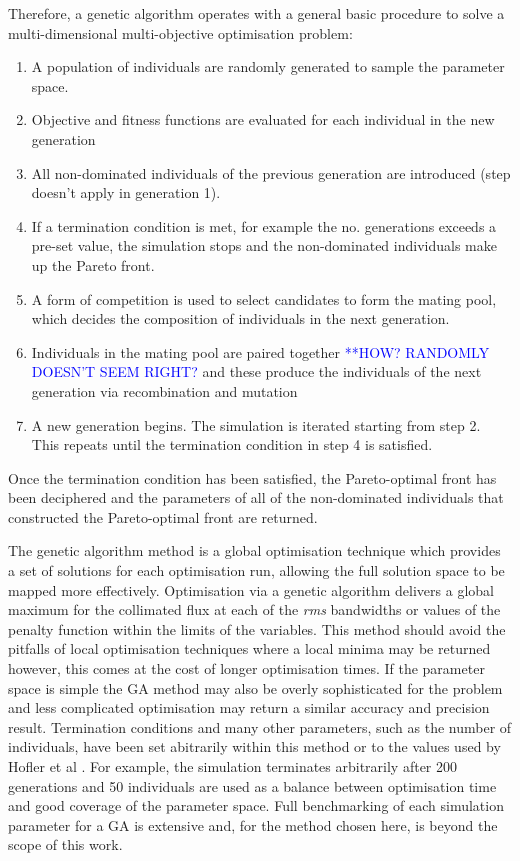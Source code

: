 \documentclass[../main.tex]{subfiles}
\begin{document}
Therefore, a genetic algorithm operates with a general basic procedure to solve a multi-dimensional multi-objective optimisation problem:
\begin{enumerate}
    \item{A population of individuals are randomly generated to sample the parameter space.}
    \item{Objective and fitness functions are evaluated for each individual in the new generation}
    \item{All non-dominated individuals of the previous generation are introduced (step doesn't apply in generation 1). }
    \item{If a termination condition is met, for example the no. generations exceeds a pre-set value, the simulation stops and the non-dominated individuals make up the Pareto front. }
    \item{A form of competition is used to select candidates to form the mating pool, which decides the composition of individuals in the next generation.}
    \item{Individuals in the mating pool are paired together \textcolor{blue}{**HOW? RANDOMLY DOESN'T SEEM RIGHT?} and these produce the individuals of the next generation via recombination and mutation}
    \item{A new generation begins. The simulation is iterated starting from step 2. This repeats until the termination condition in step 4 is satisfied.}
\end{enumerate}
Once the termination condition has been satisfied, the Pareto-optimal front has been deciphered and the parameters of all of the non-dominated individuals that constructed the Pareto-optimal front are returned. 

The genetic algorithm method is a global optimisation technique which provides a set of solutions for each optimisation run, allowing the full solution space to be mapped more effectively. Optimisation via a genetic algorithm delivers a global maximum for the collimated flux at each of the \textit{rms} bandwidths or values of the penalty function within the limits of the variables. This method should avoid the pitfalls of local optimisation techniques where a local minima may be returned however, this comes at the cost of longer optimisation times. If the parameter space is simple the GA method may also be overly sophisticated for the problem and less complicated optimisation may return a similar accuracy and precision result. Termination conditions and many other parameters, such as the number of individuals, have been set abitrarily within this method or to the values used by Hofler et al \cite{hofler2013innovative}. For example, the simulation terminates arbitrarily after 200 generations and 50 individuals are used as a balance between optimisation time and good coverage of the parameter space. Full benchmarking of each simulation parameter for a GA is extensive and, for the method chosen here, is beyond the scope of this work. 
\end{document}

